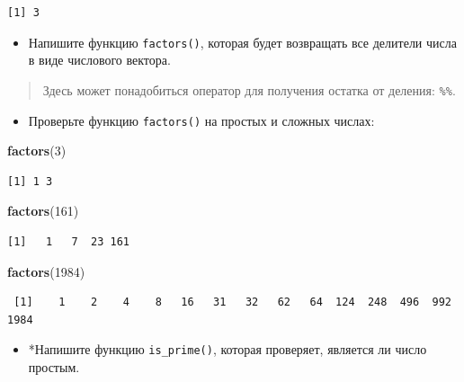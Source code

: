 \documentclass[
]{book}
\newenvironment{Shaded}{\begin{snugshade}}{\end{snugshade}}
\newcommand{\DecValTok}[1]{\textcolor[rgb]{0.00,0.00,0.81}{#1}}
\newcommand{\KeywordTok}[1]{\textcolor[rgb]{0.13,0.29,0.53}{\textbf{#1}}}
\newcommand{\NormalTok}[1]{#1}
\providecommand{\tightlist}{%
  \setlength{\itemsep}{0pt}\setlength{\parskip}{0pt}}
\begin{document}
\begin{verbatim}
[1] 3
\end{verbatim}

\begin{itemize}
\tightlist
\item
  Напишите функцию \texttt{factors()}, которая будет возвращать все делители числа в виде числового вектора.
\end{itemize}

\begin{quote}
Здесь может понадобиться оператор для получения остатка от деления: \texttt{\%\%}.
\end{quote}

\begin{itemize}
\tightlist
\item
  Проверьте функцию \texttt{factors()} на простых и сложных числах:
\end{itemize}

\begin{Shaded}
\begin{Highlighting}[]
\KeywordTok{factors}\NormalTok{(}\DecValTok{3}\NormalTok{)}
\end{Highlighting}
\end{Shaded}

\begin{verbatim}
[1] 1 3
\end{verbatim}

\begin{Shaded}
\begin{Highlighting}[]
\KeywordTok{factors}\NormalTok{(}\DecValTok{161}\NormalTok{)}
\end{Highlighting}
\end{Shaded}

\begin{verbatim}
[1]   1   7  23 161
\end{verbatim}

\begin{Shaded}
\begin{Highlighting}[]
\KeywordTok{factors}\NormalTok{(}\DecValTok{1984}\NormalTok{)}
\end{Highlighting}
\end{Shaded}

\begin{verbatim}
 [1]    1    2    4    8   16   31   32   62   64  124  248  496  992 1984
\end{verbatim}

\begin{itemize}
\tightlist
\item
  *Напишите функцию \texttt{is\_prime()}, которая проверяет, является ли число простым.
\end{itemize}
\end{document}
